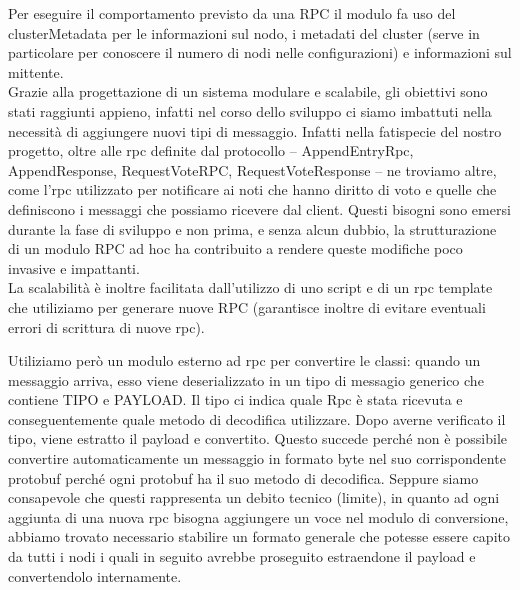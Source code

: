 Per eseguire il comportamento previsto da una RPC il modulo fa uso del clusterMetadata 
per le informazioni sul nodo, i metadati del cluster (serve in particolare per conoscere 
il numero di nodi nelle configurazioni) e informazioni sul mittente. \\
Grazie alla progettazione di un sistema modulare e scalabile, gli obiettivi sono stati raggiunti 
appieno, infatti nel corso dello sviluppo ci siamo imbattuti nella necessità di aggiungere nuovi 
tipi di messaggio. Infatti nella fatispecie del nostro progetto, oltre alle rpc definite dal protocollo 
-- AppendEntryRpc, AppendResponse, RequestVoteRPC, RequestVoteResponse -- ne troviamo altre, 
come l'rpc utilizzato per notificare ai noti che hanno diritto di voto e quelle che definiscono 
i messaggi che possiamo ricevere dal client. Questi bisogni sono emersi durante la fase di 
sviluppo e non prima, e senza alcun dubbio, la strutturazione di un modulo RPC ad hoc 
ha contribuito a rendere queste modifiche poco invasive e impattanti. \\
La scalabilità è inoltre facilitata dall'utilizzo di uno script e di un rpc template 
che utiliziamo per generare nuove RPC (garantisce inoltre di evitare eventuali errori di 
scrittura di nuove rpc). 

Utiliziamo però un modulo esterno ad rpc per convertire le classi: quando un messaggio 
arriva, esso viene deserializzato in un tipo di messagio generico che contiene TIPO e PAYLOAD. 
Il tipo ci indica quale Rpc è stata ricevuta e conseguentemente quale metodo di decodifica utilizzare. 
Dopo averne verificato il tipo, viene estratto il payload e convertito. 
Questo succede perché non è possibile convertire automaticamente un messaggio in formato byte nel suo 
corrispondente protobuf perché ogni protobuf ha il suo metodo di decodifica. Seppure siamo 
consapevole che questi rappresenta un debito tecnico (limite), in quanto ad ogni aggiunta di 
una nuova rpc bisogna aggiungere un voce nel modulo di conversione, abbiamo trovato 
necessario stabilire un formato generale che potesse essere capito da tutti i nodi i quali 
in seguito avrebbe proseguito estraendone il payload e convertendolo internamente.

